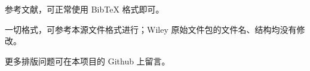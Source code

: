 \documentclass{WileySev}
\begin{document}
参考文献，可正常使用 BibTeX 格式即可。

一切格式，可参考本源文件格式进行；Wiley 原始文件包的文件名、结构均没有修改。

更多排版问题可在本项目的 Github 上留言。





%
%




\end{document}

